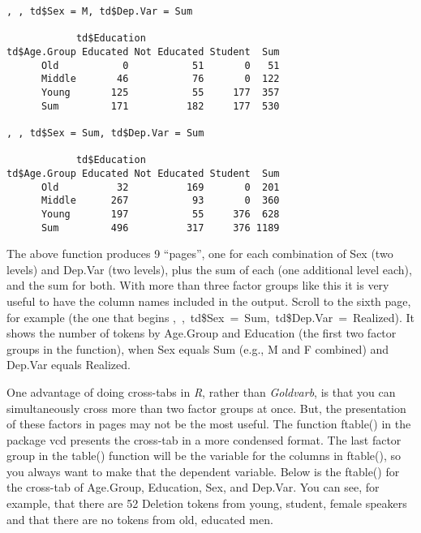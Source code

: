 \documentclass[
  12pt,
  letterpaper]{article}
\newenvironment{Shaded}{\begin{snugshade}}{\end{snugshade}}
\newcommand{\CommentTok}[1]{\textcolor[rgb]{0.37,0.37,0.37}{#1}}
\newcommand{\FunctionTok}[1]{\textcolor[rgb]{0.28,0.35,0.67}{#1}}
\newcommand{\NormalTok}[1]{\textcolor[rgb]{0.00,0.23,0.31}{#1}}
\newcommand{\SpecialCharTok}[1]{\textcolor[rgb]{0.37,0.37,0.37}{#1}}
\renewcommand\texttt[1]{{\ttfamily\color{BrickRed}#1}}
\begin{document}
\begin{verbatim}
, , td$Sex = M, td$Dep.Var = Sum

            td$Education
td$Age.Group Educated Not Educated Student  Sum
      Old           0           51       0   51
      Middle       46           76       0  122
      Young       125           55     177  357
      Sum         171          182     177  530

, , td$Sex = Sum, td$Dep.Var = Sum

            td$Education
td$Age.Group Educated Not Educated Student  Sum
      Old          32          169       0  201
      Middle      267           93       0  360
      Young       197           55     376  628
      Sum         496          317     376 1189
\end{verbatim}

The above function produces 9 ``pages'', one for each combination of
\texttt{Sex} (two levels) and \texttt{Dep.Var} (two levels), plus the
sum of each (one additional level each), and the sum for both. With more
than three factor groups like this it is very useful to have the column
names included in the output. Scroll to the sixth page, for example (the
one that begins
\texttt{,\ ,\ td\$Sex\ =\ Sum,\ td\$Dep.Var\ =\ Realized}). It shows the
number of tokens by \texttt{Age.Group} and \texttt{Education} (the first
two factor groups in the function), when \texttt{Sex} equals
\texttt{Sum} (e.g., \texttt{M} and \texttt{F} combined) and
\texttt{Dep.Var} equals \texttt{Realized}.

One advantage of doing cross-tabs in \emph{R}, rather than
\emph{Goldvarb}, is that you can simultaneously cross more than two
factor groups at once. But, the presentation of these factors in pages
may not be the most useful. The function \texttt{ftable()} in the
package \texttt{vcd} presents the cross-tab in a more condensed format.
The last factor group in the \texttt{table()} function will be the
variable for the columns in \texttt{ftable()}, so you always want to
make that the dependent variable. Below is the \texttt{ftable()} for the
cross-tab of \texttt{Age.Group}, \texttt{Education}, \texttt{Sex}, and
\texttt{Dep.Var}. You can see, for example, that there are 52
\texttt{Deletion} tokens from young, student, female speakers and that
there are no tokens from old, educated men.

\begin{Shaded}
\end{Shaded}
\end{document}
